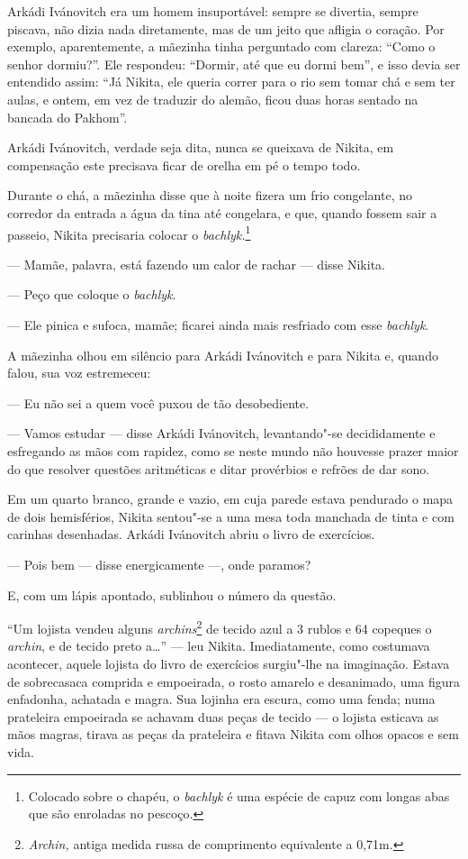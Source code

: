 Arkádi Ivánovitch era um homem insuportável: sempre se divertia, sempre
piscava, não dizia nada diretamente, mas de um jeito que afligia o
coração. Por exemplo, aparentemente, a mãezinha tinha perguntado com
clareza: ``Como o senhor dormiu?''. Ele respondeu: ``Dormir, até que eu
dormi bem'', e isso devia ser entendido assim: ``Já Nikita, ele queria
correr para o rio sem tomar chá e sem ter aulas, e ontem, em vez de
traduzir do alemão, ficou duas horas sentado na bancada do Pakhom''.

Arkádi Ivánovitch, verdade seja dita, nunca se queixava de Nikita, em
compensação este precisava ficar de orelha em pé o tempo todo.

Durante o chá, a mãezinha disse que à noite fizera um frio congelante,
no corredor da entrada a água da tina até congelara, e que, quando
fossem sair a passeio, Nikita precisaria colocar o
\emph{bachlyk.}\footnote{Colocado sobre o chapéu, o \emph{bachlyk} é uma
  espécie de capuz com longas abas que são enroladas no pescoço.}

--- Mamãe, palavra, está fazendo um calor de rachar --- disse Nikita.

--- Peço que coloque o \emph{bachlyk}.

--- Ele pinica e sufoca, mamãe; ficarei ainda mais resfriado com esse
\emph{bachlyk}.

A mãezinha olhou em silêncio para Arkádi Ivánovitch e para Nikita e,
quando falou, sua voz estremeceu:

--- Eu não sei a quem você puxou de tão desobediente.

--- Vamos estudar --- disse Arkádi Ivánovitch, levantando"-se
decididamente e esfregando as mãos com rapidez, como se neste mundo não
houvesse prazer maior do que resolver questões aritméticas e ditar
provérbios e refrões de dar sono.

Em um quarto branco, grande e vazio, em cuja parede estava pendurado o
mapa de dois hemisférios, Nikita sentou"-se a uma mesa toda manchada de
tinta e com carinhas desenhadas. Arkádi Ivánovitch abriu o livro de
exercícios.

--- Pois bem --- disse energicamente ---, onde paramos?

E, com um lápis apontado, sublinhou o número da questão.

``Um lojista vendeu alguns \emph{archins}\footnote{\emph{Archin,} antiga
  medida russa de comprimento equivalente a 0,71m.} de tecido azul a 3
rublos e 64 copeques o \emph{archin}, e de tecido preto a\ldots{}'' --- leu
Nikita. Imediatamente, como costumava acontecer, aquele lojista do livro
de exercícios surgiu"-lhe na imaginação. Estava de sobrecasaca comprida e
empoeirada, o rosto amarelo e desanimado, uma figura enfadonha, achatada e
magra. Sua lojinha era escura, como uma fenda; numa prateleira
empoeirada se achavam duas peças de tecido --- o lojista esticava as mãos
magras, tirava as peças da prateleira e fitava Nikita com olhos opacos e
sem vida.

